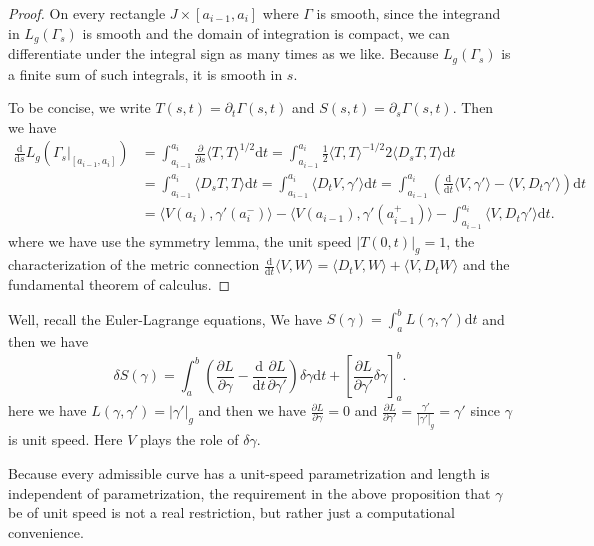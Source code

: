 \documentclass[../main.tex]{subfiles}
\begin{document}
\begin{proof}
  On every rectangle $J \times [a_{i-1}, a_i]$ where $\Gamma$ is smooth, since the integrand in $L_g(\Gamma_s)$ is smooth and the domain of integration is compact, we can differentiate under the integral sign as many times as we like. Because $L_g(\Gamma_s)$ is a finite sum of such integrals, it is smooth in $s$.

  To be concise, we write $T(s,t) = \partial_t \Gamma(s,t)$ and $S(s,t) = \partial_s \Gamma(s,t)$. Then we have
  \begin{equation*}
    \begin{aligned}
      \frac{\mathrm{d}}{\mathrm{d} s} L_g(\Gamma_s|_{[a_{i-1}, a_i]}) %
      &= \int_{a_{i-1}}^{a_i} \frac{\partial}{\partial s} \langle T, T \rangle^{1/2} \mathrm{d} t = \int_{a_{i-1}}^{a_i} \frac{1}{2} \langle T, T \rangle^{-1/2} 2 \langle D_s T, T \rangle \mathrm{d} t \\
      &= \int_{a_{i-1}}^{a_i} \langle D_s T, T \rangle \mathrm{d} t = \int_{a_{i-1}}^{a_i} \langle D_t V, \gamma' \rangle \mathrm{d} t = \int_{a_{i-1}}^{a_i} \left( \frac{\mathrm{d}}{\mathrm{d} t} \langle V, \gamma' \rangle - \langle V, D_t \gamma' \rangle \right) \mathrm{d} t \\
      &= \langle V(a_i), \gamma'(a_i^-) \rangle - \langle V(a_{i-1}), \gamma'(a_{i-1}^+) \rangle - \int_{a_{i-1}}^{a_i} \langle V, D_t \gamma' \rangle \mathrm{d} t.
    \end{aligned}
  \end{equation*}
  where we have use the symmetry lemma, the unit speed $|T(0,t)|_g = 1$, the characterization of the metric connection $\frac{\mathrm{d}}{\mathrm{d} t} \langle V, W \rangle = \langle D_t V, W \rangle + \langle V, D_t W \rangle$ and the fundamental theorem of calculus.
\end{proof}

\begin{remark}
    Well, recall the Euler-Lagrange equations, We have $S(\gamma) = \int_a^b L(\gamma, \gamma') \mathrm{d} t$ and then we have
  \begin{equation*}
    \delta S(\gamma) = \int_a^b \left( \frac{\partial L}{\partial \gamma} - \frac{\mathrm{d}}{\mathrm{d} t} \frac{\partial L}{\partial \gamma'} \right) \delta \gamma \mathrm{d} t + \left[ \frac{\partial L}{\partial \gamma'} \delta \gamma \right]_a^b.
  \end{equation*}
  here we have $L(\gamma, \gamma') = |\gamma'|_g$ and then we have $\frac{\partial L}{\partial \gamma} = 0$ and $\frac{\partial L}{\partial \gamma'} = \frac{\gamma'}{|\gamma'|_g} = \gamma'$ since $\gamma$ is unit speed. Here $V$ plays the role of $\delta \gamma$.

  Because every admissible curve has a unit-speed parametrization and length is independent of parametrization, the requirement in the above proposition that $\gamma$ be of unit speed is not a real restriction, but rather just a computational convenience.
\end{remark}
\end{document}
